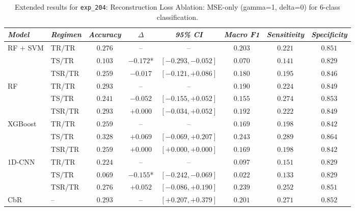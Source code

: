 \begin{table}[H]
\centering
\scriptsize
\caption{Extended results for \texttt{exp\_204}: Reconstruction Loss Ablation: MSE-only (gamma=1, delta=0) for 6-class classification.}
\label{tab:appendix_exp_204}
\begin{tabular*}{\textwidth}{@{\extracolsep{\fill}}llcccccc}
\toprule
\emph{Model} & \emph{Regimen} & \emph{Accuracy} & \emph{$\Delta$} & \emph{95\% CI} & \emph{Macro F1} & \emph{Sensitivity} & \emph{Specificity}\\
\midrule
\multirow{3}{*}{RF + SVM} & TR/TR & $0.276$ & -- & -- & $0.203$ & $0.221$ & $0.851$\\
 & TS/TR & $0.103$ & $-0.172$* & $[-0.293, -0.052]$ & $0.070$ & $0.141$ & $0.829$\\
 & TSR/TR & $0.259$ & $-0.017$ & $[-0.121, +0.086]$ & $0.180$ & $0.195$ & $0.846$\\
\midrule
\multirow{3}{*}{RF} & TR/TR & $0.293$ & -- & -- & $0.190$ & $0.224$ & $0.849$\\
 & TS/TR & $0.241$ & $-0.052$ & $[-0.155, +0.052]$ & $0.155$ & $0.274$ & $0.853$\\
 & TSR/TR & $0.293$ & $+0.000$ & $[-0.034, +0.052]$ & $0.192$ & $0.222$ & $0.849$\\
\midrule
\multirow{3}{*}{XGBoost} & TR/TR & $0.259$ & -- & -- & $0.169$ & $0.198$ & $0.842$\\
 & TS/TR & $0.328$ & $+0.069$ & $[-0.069, +0.207]$ & $0.243$ & $0.289$ & $0.864$\\
 & TSR/TR & $0.259$ & $+0.000$ & $[+0.000, +0.000]$ & $0.169$ & $0.198$ & $0.842$\\
\midrule
\multirow{3}{*}{1D-CNN} & TR/TR & $0.224$ & -- & -- & $0.097$ & $0.151$ & $0.829$\\
 & TS/TR & $0.069$ & $-0.155$* & $[-0.242, -0.069]$ & $0.022$ & $0.133$ & $0.829$\\
 & TSR/TR & $0.276$ & $+0.052$ & $[-0.086, +0.190]$ & $0.239$ & $0.252$ & $0.851$\\
\midrule
CbR & -- & $0.293$ & -- & $[+0.207, +0.379]$ & $0.201$ & $0.271$ & $0.852$\\
\bottomrule
\end{tabular*}
\end{table}

